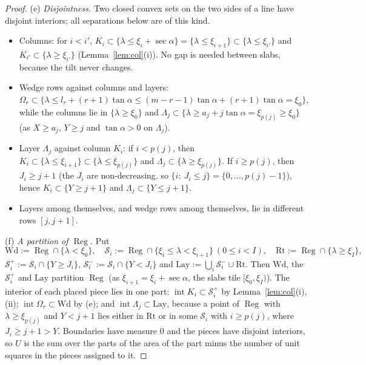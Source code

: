 \documentclass[11pt]{amsart}
\newcommand{\Reg}{\operatorname{Reg}}
\newcommand{\ta}{\tan\alpha}
\newcommand{\se}{\sec\alpha}
\theoremstyle{definition}
\theoremstyle{remark}
\numberwithin{equation}{section}
\begin{document}
\begin{proof}
(e) \emph{Disjointness.} Two closed convex sets on the two sides of a line have disjoint interiors; all separations
below are of this kind.
\begin{itemize}
\item Columns: for $i<i'$, $K_i\subset\{\lambda\le\xi_i+\se\}=\{\lambda\le\xi_{i+1}\}\subset\{\lambda\le\xi_{i'}\}$ and
$K_{i'}\subset\{\lambda\ge\xi_{i'}\}$ (Lemma~\ref{lem:col}(i)). No gap is needed between slabs, because the tilt never
changes.
\item Wedge rows against columns and layers: $\Omega_r\subset\{\lambda\le l_r+(r+1)\ta\le(m-r-1)\ta+(r+1)\ta=\xi_0\}$,
while the columns lie in $\{\lambda\ge\xi_0\}$ and $\Lambda_j\subset\{\lambda\ge a_j+j\ta=\xi_{p(j)}\ge\xi_0\}$ (as
$X\ge a_j$, $Y\ge j$ and $\ta>0$ on $\Lambda_j$).
\item Layer $\Lambda_j$ against column $K_i$: if $i<p(j)$, then $K_i\subset\{\lambda\le\xi_{i+1}\}\subset
\{\lambda\le\xi_{p(j)}\}$ and $\Lambda_j\subset\{\lambda\ge\xi_{p(j)}\}$. If $i\ge p(j)$, then $J_i\ge j+1$ (the $J_i$ are
non-decreasing, so $\{i:\ J_i\le j\}=\{0,\dots,p(j)-1\}$), hence $K_i\subset\{Y\ge j+1\}$ and $\Lambda_j\subset\{Y\le j+1\}$.
\item Layers among themselves, and wedge rows among themselves, lie in different rows $[j,j+1]$.
\end{itemize}

(f) \emph{A partition of $\Reg$.} Put
\[
\mathrm{Wd}:=\Reg\cap\{\lambda<\xi_0\},\quad \mathcal S_i:=\Reg\cap\{\xi_i\le\lambda<\xi_{i+1}\}\ (0\le i<I),\quad
\mathrm{Rt}:=\Reg\cap\{\lambda\ge\xi_I\},
\]
$\mathcal S_i^+:=\mathcal S_i\cap\{Y\ge J_i\}$, $\mathcal S_i^-:=\mathcal S_i\cap\{Y<J_i\}$ and
$\mathrm{Lay}:=\bigcup_i\mathcal S_i^-\cup\mathrm{Rt}$. Then $\mathrm{Wd}$, the $\mathcal S_i^+$ and $\mathrm{Lay}$
partition $\Reg$ (as $\xi_{i+1}=\xi_i+\se$, the slabs tile $[\xi_0,\xi_I)$). The interior of each placed piece lies in
one part: $\operatorname{int}K_i\subset\mathcal S_i^+$ by Lemma~\ref{lem:col}(i),(ii);
$\operatorname{int}\Omega_r\subset\mathrm{Wd}$ by (e); and $\operatorname{int}\Lambda_j\subset\mathrm{Lay}$, because a
point of $\Reg$ with $\lambda\ge\xi_{p(j)}$ and $Y<j+1$ lies either in $\mathrm{Rt}$ or in some $\mathcal S_i$ with
$i\ge p(j)$, where $J_i\ge j+1>Y$. Boundaries have measure $0$ and the pieces have disjoint interiors, so $U$ is the
sum over the parts of the area of the part minus the number of unit squares in the pieces assigned to it.


\end{proof}
\end{document}
